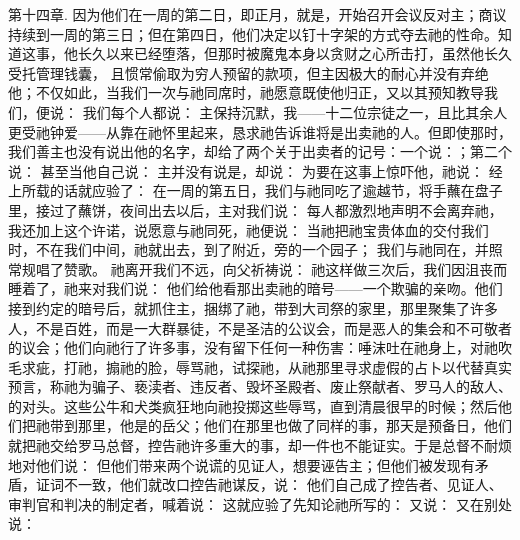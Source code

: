 第十四章. 因为他们在一周的第二日，即正月，就是，开始召开会议反对主；商议持续到一周的第三日；但在第四日，他们决定以钉十字架的方式夺去祂的性命。知道这事，他长久以来已经堕落，但那时被魔鬼本身以贪财之心所击打，虽然他长久受托管理钱囊， 且惯常偷取为穷人预留的款项，但主因极大的耐心并没有弃绝他；不仅如此，当我们一次与祂同席时，祂愿意既使他归正，又以其预知教导我们，便说： 我们每个人都说： 主保持沉默，我——十二位宗徒之一，且比其余人更受祂钟爱——从靠在祂怀里起来，恳求祂告诉谁将是出卖祂的人。但即使那时，我们善主也没有说出他的名字，却给了两个关于出卖者的记号：一个说：；第二个说： 甚至当他自己说： 主并没有说是，却说： 为要在这事上惊吓他，祂说：  经上所载的话就应验了：  在一周的第五日，我们与祂同吃了逾越节，将手蘸在盘子里，接过了蘸饼，夜间出去以后，主对我们说：  每人都激烈地声明不会离弃祂，我还加上这个许诺，说愿意与祂同死，祂便说：  当祂把祂宝贵体血的交付我们时，不在我们中间，祂就出去，到了附近，旁的一个园子； 我们与祂同在，并照常规唱了赞歌。 祂离开我们不远，向父祈祷说： 祂这样做三次后，我们因沮丧而睡着了，祂来对我们说：  他们给他看那出卖祂的暗号——一个欺骗的亲吻。他们接到约定的暗号后，就抓住主，捆绑了祂，带到大司祭的家里，那里聚集了许多人，不是百姓，而是一大群暴徒，不是圣洁的公议会，而是恶人的集会和不可敬者的议会；他们向祂行了许多事，没有留下任何一种伤害：唾沫吐在祂身上，对祂吹毛求疵，打祂，搧祂的脸，辱骂祂，试探祂，从祂那里寻求虚假的占卜以代替真实预言，称祂为骗子、亵渎者、违反者、毁坏圣殿者、废止祭献者、罗马人的敌人、的对头。这些公牛和犬类疯狂地向祂投掷这些辱骂，直到清晨很早的时候；然后他们把祂带到那里，他是的岳父；他们在那里也做了同样的事，那天是预备日，他们就把祂交给罗马总督，控告祂许多重大的事，却一件也不能证实。于是总督不耐烦地对他们说：  但他们带来两个说谎的见证人，想要诬告主；但他们被发现有矛盾，证词不一致，他们就改口控告祂谋反，说：  他们自己成了控告者、见证人、审判官和判决的制定者，喊着说：  这就应验了先知论祂所写的： 又说： 又在别处说：  